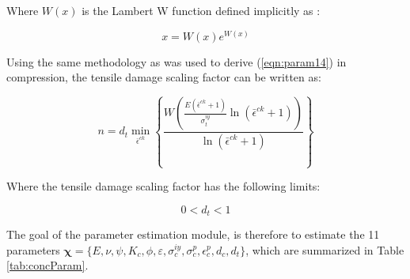 Where $W\left(x\right)$ is the Lambert W function defined implicitly as \cite{Corless_1996}:

\begin{equation}
x=W\left(x\right)e^{W(x)}\label{eqn:param8}
\end{equation}

Using the same methodology as was used to derive (\ref{eqn:param14}) in compression, the tensile damage scaling factor can be written as:

\begin{equation}
n=d_{t}\min_{\bar{\epsilon}^{ck}}\left\{\frac{W\left(\frac{E\left(\bar{\epsilon}^{ck}+1\right)}{\sigma_{t}^{iy}}\ln\left(\bar{\epsilon}^{ck}+1\right)\right)}{\ln\left(\bar{\epsilon}^{ck}+1\right)}\right\}
\label{eqn:param9}
\end{equation}

Where the tensile damage scaling factor has the following limits:

\begin{equation}
0<d_{t}<1\label{eqn:param10}
\end{equation}

The goal of the parameter estimation module, is therefore to estimate the 11 parameters $\boldsymbol{\chi}=\{E,\nu,\psi, K_c, \phi, \varepsilon, \sigma_c^{iy},\allowbreak\sigma_{c}^{p}, \epsilon_c^{p}, d_c, d_t \}$, which are summarized in Table \ref{tab:concParam}.

